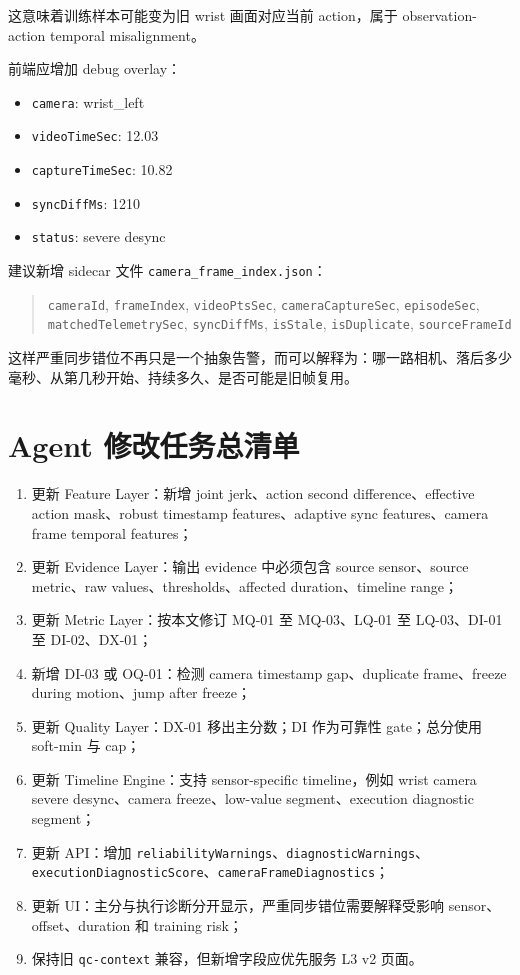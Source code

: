 \documentclass[UTF8,zihao=-4,oneside,openany]{ctexrep}
\newcommand{\Code}[1]{\texttt{#1}}
\begin{document}
这意味着训练样本可能变为旧 wrist 画面对应当前 action，属于 observation-action temporal misalignment。

前端应增加 debug overlay：

\begin{itemize}
\item \Code{camera}: wrist\_left
\item \Code{videoTimeSec}: 12.03
\item \Code{captureTimeSec}: 10.82
\item \Code{syncDiffMs}: 1210
\item \Code{status}: severe desync
\end{itemize}

建议新增 sidecar 文件 \Code{camera\_frame\_index.json}：

\begin{quote}\small
\Code{cameraId}, \Code{frameIndex}, \Code{videoPtsSec}, \Code{cameraCaptureSec}, \Code{episodeSec}, \Code{matchedTelemetrySec}, \Code{syncDiffMs}, \Code{isStale}, \Code{isDuplicate}, \Code{sourceFrameId}
\end{quote}

这样严重同步错位不再只是一个抽象告警，而可以解释为：哪一路相机、落后多少毫秒、从第几秒开始、持续多久、是否可能是旧帧复用。

\section{Agent 修改任务总清单}

\begin{enumerate}
\item 更新 Feature Layer：新增 joint jerk、action second difference、effective action mask、robust timestamp features、adaptive sync features、camera frame temporal features；
\item 更新 Evidence Layer：输出 evidence 中必须包含 source sensor、source metric、raw values、thresholds、affected duration、timeline range；
\item 更新 Metric Layer：按本文修订 MQ-01 至 MQ-03、LQ-01 至 LQ-03、DI-01 至 DI-02、DX-01；
\item 新增 DI-03 或 OQ-01：检测 camera timestamp gap、duplicate frame、freeze during motion、jump after freeze；
\item 更新 Quality Layer：DX-01 移出主分数；DI 作为可靠性 gate；总分使用 soft-min 与 cap；
\item 更新 Timeline Engine：支持 sensor-specific timeline，例如 wrist camera severe desync、camera freeze、low-value segment、execution diagnostic segment；
\item 更新 API：增加 \Code{reliabilityWarnings}、\Code{diagnosticWarnings}、\Code{executionDiagnosticScore}、\Code{cameraFrameDiagnostics}；
\item 更新 UI：主分与执行诊断分开显示，严重同步错位需要解释受影响 sensor、offset、duration 和 training risk；
\item 保持旧 \Code{qc-context} 兼容，但新增字段应优先服务 L3 v2 页面。
\end{enumerate}
\end{document}

